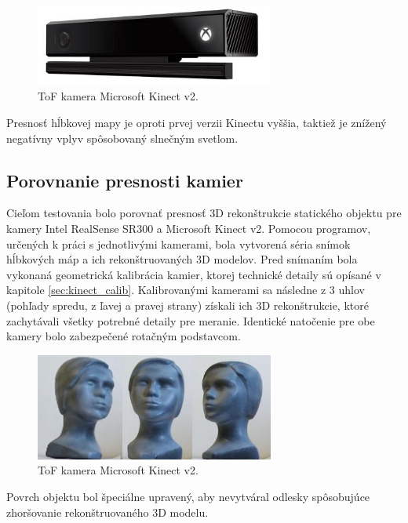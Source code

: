 \begin{figure}[H]
	\centering
	\includegraphics[width=0.7\textwidth]{figures/kinect.png}
	\caption{ToF kamera Microsoft Kinect v2.}
	\label{fig::kinect}
\end{figure}

Presnosť hĺbkovej mapy je oproti prvej verzii Kinectu vyššia, taktiež je znížený negatívny vplyv spôsobovaný slnečným svetlom.


\subsection{Porovnanie presnosti kamier}

Cieľom testovania bolo porovnať presnosť 3D rekonštrukcie statického objektu pre kamery Intel RealSense SR300 a Microsoft Kinect v2. Pomocou programov, určených k práci s jednotlivými kamerami, bola vytvorená séria snímok hĺbkových máp a ich rekonštruovaných 3D modelov. Pred snímaním bola vykonaná geometrická kalibrácia kamier, ktorej technické detaily sú opísané v kapitole \ref{sec:kinect_calib}. Kalibrovanými kamerami sa následne z 3 uhlov (pohľady spredu, z ľavej a pravej strany) získali ich 3D rekonštrukcie, ktoré zachytávali všetky potrebné detaily pre meranie. Identické natočenie pre obe kamery bolo zabezpečené rotačným podstavcom. 

\begin{figure}[H]
	\centering
	\includegraphics[width=0.7\textwidth]{figures/rgb_compar.png}
	\caption{ToF kamera Microsoft Kinect v2.}
	\label{fig::rgb_compare}
\end{figure}

Povrch objektu bol špeciálne upravený, aby nevytváral odlesky spôsobujúce zhoršovanie rekonštruovaného 3D modelu. 

